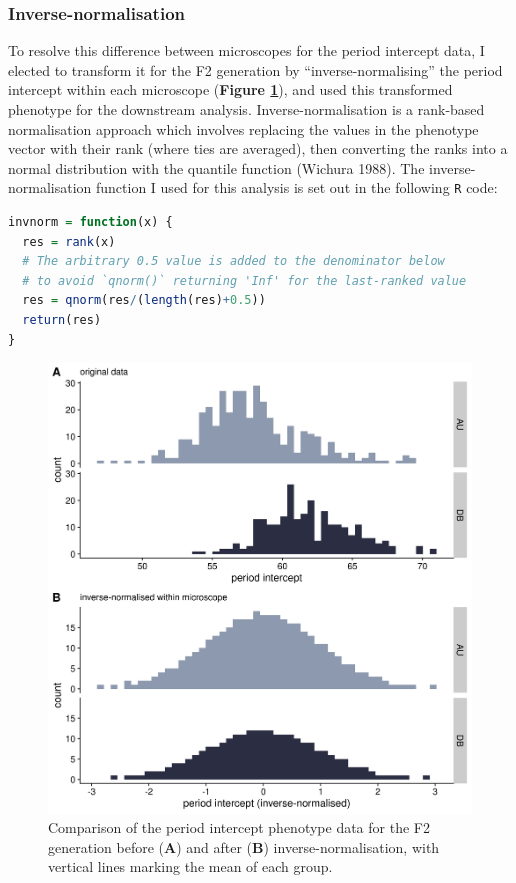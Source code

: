 \documentclass[
]{book}
\newcommand{\passthrough}[1]{#1}
\begin{document}
\hypertarget{inverse-norm-sec}{%
\subsubsection{Inverse-normalisation}\label{inverse-norm-sec}}

To resolve this difference between microscopes for the period intercept data, I elected to transform it for the F2 generation by ``inverse-normalising'' the period intercept within each microscope (\textbf{Figure \ref{fig:invnorm-intercept}}), and used this transformed phenotype for the downstream analysis. Inverse-normalisation is a rank-based normalisation approach which involves replacing the values in the phenotype vector with their rank (where ties are averaged), then converting the ranks into a normal distribution with the quantile function (Wichura 1988). The inverse-normalisation function I used for this analysis is set out in the following \passthrough{\lstinline!R!} code:

\begin{lstlisting}[language=R]
invnorm = function(x) {
  res = rank(x)
  # The arbitrary 0.5 value is added to the denominator below 
  # to avoid `qnorm()` returning 'Inf' for the last-ranked value
  res = qnorm(res/(length(res)+0.5))
  return(res)
}
\end{lstlisting}



\begin{figure}
\includegraphics[width=1\linewidth]{figs/somites/invnorm_intercept} \caption{Comparison of the period intercept phenotype data for the F2 generation before (\textbf{A}) and after (\textbf{B}) inverse-normalisation, with vertical lines marking the mean of each group.}\label{fig:invnorm-intercept}
\end{figure}
\end{document}
